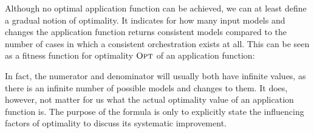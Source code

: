 Although no optimal application function can be achieved, we can at least define a gradual notion of optimality.
It indicates for how many input models and changes the application function returns consistent models compared to the number of cases in which a consistent orchestration exists at all.
This can be seen as a fitness function for optimality $\textsc{Opt}$ of an application function:
%

In fact, the numerator and denominator will usually both have infinite values, as there is an infinite number of possible models and changes to them.
It does, however, not matter for us what the actual optimality value of an application function is.
The purpose of the formula is only to explicitly state the influencing factors of optimality to discuss its systematic improvement.

